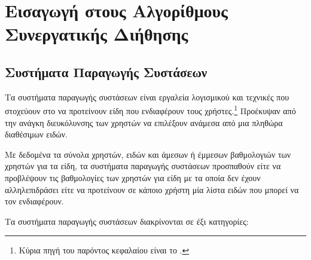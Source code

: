 \chapter{Εισαγωγή στους Aλγορίθμους Συνεργατικής Διήθησης}
\label{chap:theory}
\section{Συστήματα Παραγωγής Συστάσεων}
Τα συστήματα παραγωγής συστάσεων είναι εργαλεία λογισμικού και τεχνικές που στοχεύουν στο να προτείνουν είδη που ενδιαφέρουν τους χρήστες.\cite{ricci2011recommender}\footnote{Κύρια πηγή του παρόντος κεφαλαίου είναι το \cite{ricci2011recommender}.} Προέκυψαν από την ανάγκη διευκόλυνσης των χρηστών να επιλέξουν ανάμεσα από μια πληθώρα διαθέσιμων ειδών.\par
Με δεδομένα τα σύνολα χρηστών, ειδών και άμεσων ή έμμεσων βαθμολογιών των χρηστών για τα είδη, τα συστήματα παραγωγής συστάσεων προσπαθούν είτε να προβλέψουν τις βαθμολογίες των χρηστών για είδη με τα οποία δεν έχουν αλληλεπιδράσει είτε να προτείνουν σε κάποιο χρήστη μία λίστα ειδών που μπορεί να τον ενδιαφέρουν. \cite{Nikolakopoulos2015126} \par
Τα συστήματα παραγωγής συστάσεων διακρίνονται σε έξι κατηγορίες\cite{Burke:2007:HWR:1768197.1768211}:
